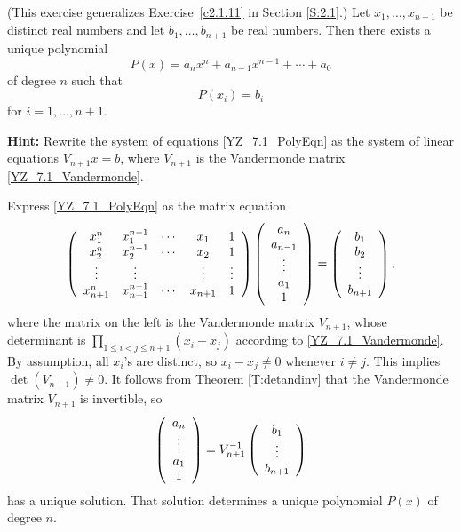 \documentclass{ximera}
\begin{document}
\begin{exercise} \label{YZ_7.1_Polynomial_Interpolation}(This exercise generalizes Exercise~\ref{c2.1.11} in Section \ref{S:2.1}.)
Let $x_1,\ldots,x_{n+1}$ be distinct real numbers and let $b_1,\ldots, b_{n+1}$ be real numbers. Then 
there exists a unique polynomial 
\[
P(x)=a_nx^n+a_{n-1}x^{n-1}+\cdots+a_0
\]
of degree $n$ such that 
\begin{equation} \label{YZ_7.1_PolyEqn}
    P(x_i)=b_i
\end{equation}
for $i=1,\ldots, n+1$.

{\bf Hint:} Rewrite the system of equations \eqref{YZ_7.1_PolyEqn} as the system of linear equations $V_{n+1} x = b$, where $V_{n+1}$ is the Vandermonde matrix \eqref{YZ_7.1_Vandermonde}.
\begin{solution}

\soln 
Express \eqref{YZ_7.1_PolyEqn} as the matrix equation
\[
\left(\begin{array}{cccccccccccc} x_1^n &x_1^{n-1}&\cdots&x_1&1\\
x_2^n &x_2^{n-1}&\cdots&x_2&1\\
\vdots&\vdots & & \vdots &\vdots\\
x_{n+1}^n &x_{n+1}^{n-1}&\cdots&x_{n+1}&1\\ \end{array}\right)\left(\begin{array}{cccccccccccc} a_n\\a_{n-1}\\ \vdots\\ a_1\\1 \end{array}\right)=\left(\begin{array}{cccccccccccc} b_1 \\ b_2 \\ \vdots\\b_{n+1} \end{array}\right),
\]
where the matrix on the left is the Vandermonde matrix $V_{n+1}$, whose determinant is $\prod_{1\le i<j\le n+1}(x_i-x_j)$ according to \eqref{YZ_7.1_Vandermonde}. By assumption, all $x_i$'s are distinct, so $x_i-x_j\neq 0$ whenever $i\neq j$. This implies $\det(V_{n+1})\neq 0$. 
It follows from Theorem \ref{T:detandinv} that the Vandermonde matrix $V_{n+1}$ is invertible, so  
\[
\left(\begin{array}{cccccccccccc} a_n\\ \vdots \\ a_1 \\1 \end{array}\right)=V_{n+1}^{-1}\left(\begin{array}{cccccccccccc} b_1\\ \vdots\\b_{n+1} \end{array}\right)
\]
has a unique solution. That solution determines a unique polynomial $P(x)$ of degree $n$.

\end{solution}
\end{exercise}
\end{document}
